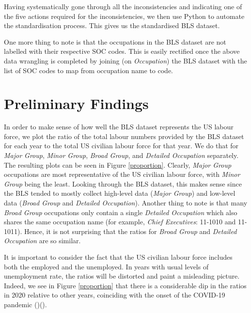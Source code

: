 \documentclass[11pt]{article}
\begin{document}
Having systematically gone through all the inconsistencies and indicating one of the five actions required for the inconsistencies, we then use Python to automate the standardisation process. This gives us the standardised BLS dataset.

One more thing to note is that the occupations in the BLS dataset are not labelled with their respective SOC codes. This is easily rectified once the above data wrangling is completed by joining (on \emph{Occupation}) the BLS dataset with the list of SOC codes to map from occupation name to code.

\section{Preliminary Findings}
In order to make sense of how well the BLS dataset represents the US labour force, we plot the ratio of the total labour numbers provided by the BLS dataset for each year to the total US civilian labour force for that year. We do that for \emph{Major Group}, \emph{Minor Group}, \emph{Broad Group}, and \emph{Detailed Occupation} separately. The resulting plots can be seen in Figure \ref{proportion}. Clearly, \emph{Major Group} occupations are most representative of the US civilian labour force, with \emph{Minor Group} being the least. Looking through the BLS dataset, this makes sense since the BLS tended to mostly collect high-level data (\emph{Major Group}) and low-level data (\emph{Broad Group} and \emph{Detailed Occupation}). Another thing to note is that many \emph{Broad Group} occupations only contain a single \emph{Detailed Occupation} which also shares the same occupation name (for example, \emph{Chief Executives}: 11-1010 and 11-1011). Hence, it is not surprising that the ratios for \emph{Broad Group} and \emph{Detailed Occupation} are so similar.

It is important to consider the fact that the US civilian labour force includes both the employed and the unemployed. In years with usual levels of unemployment rate, the ratios will be distorted and paint a misleading picture. Indeed, we see in Figure \ref{proportion} that there is a considerable dip in the ratios in 2020 relative to other years, coinciding with the onset of the COVID-19 pandemic (\cite{covid2020unemployment})(\cite{congresscovidunemployment}).
\end{document}
